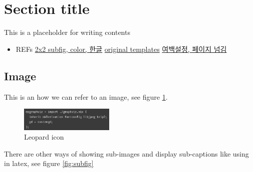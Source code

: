 \documentclass[11pt]{article}
\author{Ryu Shinyoung}
\date{}
\title{}
\begin{document}
\section*{Section title}
\label{sec:orge30729b}

This is a placeholder for writing contents
\begin{itemize}
\item REFs
\href{https://rtsd.tistory.com/72}{2x2 subfig, color, 한글}     \href{https://github.com/GeneKao/orgmode-latex-templates/tree/master/simple}{original templates}   \href{https://m.blog.naver.com/jieunz818/221380266593}{여백설정, 페이지 넘김}
\end{itemize}

\subsection*{Image}
\label{sec:org7ca4420}

This is an how we can refer to an image, see figure \ref{fig:leopard-icon}.

\begin{figure}[htbp]
\centering
\includegraphics[width=0.4\textwidth]{../../img/7/Input pattern.png}
\caption{\label{fig:leopard-icon}Leopard icon}
\end{figure}

There are other ways of showing sub-images and display sub-captions like using in latex,
see figure \ref{fig:subfig}
\end{document}
